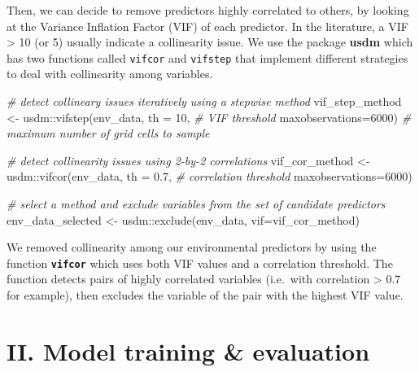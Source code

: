 \documentclass[
]{article}
\newenvironment{Shaded}{\begin{snugshade}}{\end{snugshade}}
\newcommand{\AttributeTok}[1]{\textcolor[rgb]{0.77,0.63,0.00}{#1}}
\newcommand{\CommentTok}[1]{\textcolor[rgb]{0.56,0.35,0.01}{\textit{#1}}}
\newcommand{\DecValTok}[1]{\textcolor[rgb]{0.00,0.00,0.81}{#1}}
\newcommand{\FloatTok}[1]{\textcolor[rgb]{0.00,0.00,0.81}{#1}}
\newcommand{\FunctionTok}[1]{\textcolor[rgb]{0.00,0.00,0.00}{#1}}
\newcommand{\NormalTok}[1]{#1}
\newcommand{\OtherTok}[1]{\textcolor[rgb]{0.56,0.35,0.01}{#1}}
\newcommand{\SpecialCharTok}[1]{\textcolor[rgb]{0.00,0.00,0.00}{#1}}
\begin{document}
Then, we can decide to remove predictors highly correlated to others, by
looking at the Variance Inflation Factor (VIF) of each predictor. In the
literature, a VIF \textgreater{} 10 (or 5) usually indicate a
collinearity issue. We use the package \textbf{usdm} which has two
functions called \texttt{vifcor} and \texttt{vifstep} that implement
different strategies to deal with collinearity among variables.

\begin{Shaded}
\begin{Highlighting}[]

\CommentTok{\# detect collineary issues iteratively using a stepwise method}
\NormalTok{vif\_step\_method }\OtherTok{\textless{}{-}}\NormalTok{ usdm}\SpecialCharTok{::}\FunctionTok{vifstep}\NormalTok{(env\_data,}
             \AttributeTok{th =} \DecValTok{10}\NormalTok{, }\CommentTok{\# VIF threshold}
             \AttributeTok{maxobservations=}\DecValTok{6000}\NormalTok{) }\CommentTok{\# maximum number of grid cells to sample}

\CommentTok{\# detect collinearity issues using 2{-}by{-}2 correlations}
\NormalTok{vif\_cor\_method }\OtherTok{\textless{}{-}}\NormalTok{ usdm}\SpecialCharTok{::}\FunctionTok{vifcor}\NormalTok{(env\_data,}
             \AttributeTok{th =} \FloatTok{0.7}\NormalTok{, }\CommentTok{\# correlation threshold}
             \AttributeTok{maxobservations=}\DecValTok{6000}\NormalTok{) }

\CommentTok{\# select a method and exclude variables from the set of candidate predictors}
\NormalTok{env\_data\_selected }\OtherTok{\textless{}{-}}\NormalTok{ usdm}\SpecialCharTok{::}\FunctionTok{exclude}\NormalTok{(env\_data, }\AttributeTok{vif=}\NormalTok{vif\_cor\_method)}
\end{Highlighting}
\end{Shaded}

\begin{infobox}
We removed collinearity among our environmental predictors by using the
function \textbf{\texttt{vifcor}} which uses both VIF values and a
correlation threshold. The function detects pairs of highly correlated
variables (i.e.~with correlation \textgreater{} 0.7 for example), then
excludes the variable of the pair with the highest VIF value.

\end{infobox}

\hypertarget{ii.-model-training-evaluation}{%
\section{II. Model training \&
evaluation}\label{ii.-model-training-evaluation}}
\end{document}
